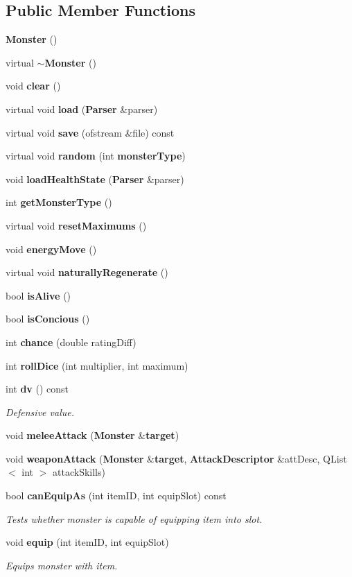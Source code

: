 \subsection*{Public Member Functions}
\begin{CompactItemize}
\item 
{\bf Monster} ()
\item 
virtual {\bf $\sim$Monster} ()
\item 
void {\bf clear} ()
\item 
virtual void {\bf load} ({\bf Parser} \&parser)
\item 
virtual void {\bf save} (ofstream \&file) const 
\item 
virtual void {\bf random} (int {\bf monster\-Type})
\item 
void {\bf load\-Health\-State} ({\bf Parser} \&parser)
\item 
int {\bf get\-Monster\-Type} ()
\item 
virtual void {\bf reset\-Maximums} ()
\item 
void {\bf energy\-Move} ()
\item 
virtual void {\bf naturally\-Regenerate} ()
\item 
bool {\bf is\-Alive} ()
\item 
bool {\bf is\-Concious} ()
\item 
int {\bf chance} (double rating\-Diff)
\item 
int {\bf roll\-Dice} (int multiplier, int maximum)
\item 
int {\bf dv} () const 
\begin{CompactList}\small\item\em Defensive value. \item\end{CompactList}\item 
void {\bf melee\-Attack} ({\bf Monster} \&{\bf target})
\item 
void {\bf weapon\-Attack} ({\bf Monster} \&{\bf target}, {\bf Attack\-Descriptor} \&att\-Desc, QList$<$ int $>$ attack\-Skills)
\item 
bool {\bf can\-Equip\-As} (int item\-ID, int equip\-Slot) const 
\begin{CompactList}\small\item\em Tests whether monster is capable of equipping item into slot. \item\end{CompactList}\item 
void {\bf equip} (int item\-ID, int equip\-Slot)
\begin{CompactList}\small\item\em Equips monster with item. \item\end{CompactList}\item 

\end{CompactItemize}
